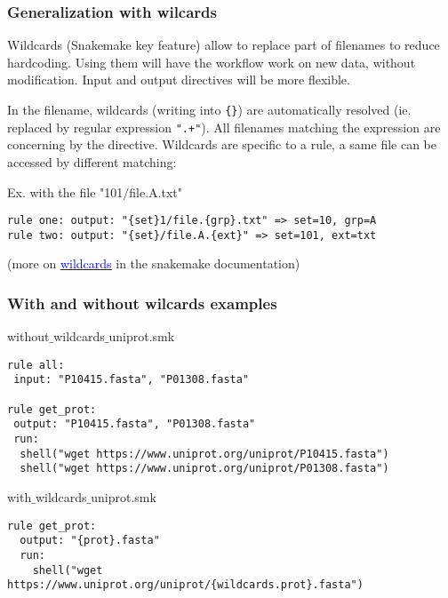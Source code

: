 \begin{frame}[containsverbatim]
\frametitle{Generalization with wilcards}
Wildcards (Snakemake key feature) allow to replace part of filenames to reduce hardcoding. 
Using them will have the workflow work on new data, without modification. 
Input and output directives will be more flexible. 

In the filename, wildcards (writing into \verb|{}|) are automatically resolved
(ie. replaced by regular expression \verb|".+"|). 
All filenames matching the expression are concerning by the directive. 
Wildcards are specific to a rule, a same file can be accessed by different matching:

\begin{block}{Ex. with the file "101$/$file.A.txt"}
\begin{lstlisting}
rule one: output: "{set}1/file.{grp}.txt" => set=10, grp=A
rule two: output: "{set}/file.A.{ext}" => set=101, ext=txt
\end{lstlisting}
\end{block}
\vfill
(more on \href{https://snakemake.readthedocs.io/en/stable/snakefiles/rules.html#wildcards}{\textcolor{blue}{\underline{wildcards}}} in the snakemake documentation)
\end{frame}
\begin{frame}[containsverbatim]
\frametitle{With and without wilcards examples}
\begin{block}{without$\_$wildcards$\_$uniprot.smk}
\begin{lstlisting}
rule all:
 input: "P10415.fasta", "P01308.fasta"

rule get_prot:
 output: "P10415.fasta", "P01308.fasta"
 run:
  shell("wget https://www.uniprot.org/uniprot/P10415.fasta")
  shell("wget https://www.uniprot.org/uniprot/P01308.fasta")
\end{lstlisting}
\end{block}
%
\begin{block}{with$\_$wildcards$\_$uniprot.smk}
\begin{lstlisting}
rule get_prot:
  output: "{prot}.fasta"
  run:
    shell("wget https://www.uniprot.org/uniprot/{wildcards.prot}.fasta")
\end{lstlisting}
\end{block}
\end{frame}
